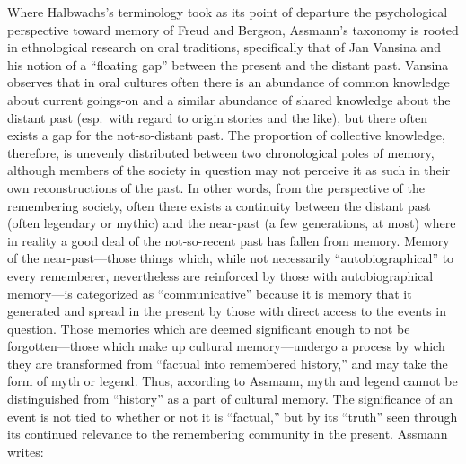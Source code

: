 Where Halbwachs's terminology took as its point of departure the
psychological perspective toward memory of
Freud\autocite{terdiman_radstone-schwarz2011} and
Bergson\autocite{ansellpearson_radstone-schwarz2011}, Assmann's taxonomy
is rooted in ethnological research on oral traditions, specifically that
of Jan Vansina and his notion of a ``floating gap'' between the present
and the distant past.\autocite{vansina1985} Vansina observes that in
oral cultures often there is an abundance of common knowledge about
current goings-on and a similar abundance of shared knowledge about the
distant past (esp.~with regard to origin stories and the like), but
there often exists a gap for the not-so-distant past. The proportion of
collective knowledge, therefore, is unevenly distributed between two
chronological poles of memory, although members of the society in
question may not perceive it as such in their own reconstructions of the
past.\autocites[23--24]{vansina1985}[As Assmann, observes, ``In the
cultural memory of a group, both levels of the past merge seamlessly
into one another.''][35]{assmann2011} In other words, from the
perspective of the remembering society, often there exists a continuity
between the distant past (often legendary or mythic) and the near-past
(a few generations, at most) where in reality a good deal of the
not-so-recent past has fallen from memory. Memory of the
near-past---those things which, while not necessarily
``autobiographical'' to every rememberer, nevertheless are reinforced by
those with autobiographical memory---is categorized as ``communicative''
because it is memory that it generated and spread in the present by
those with direct access to the events in question. Those memories which
are deemed significant enough to not be forgotten---those which make up
cultural memory---undergo a process by which they are transformed from
``factual into remembered history,'' and may take the form of myth or
legend.\autocite[37--38]{assmann2011} Thus, according to Assmann, myth
and legend cannot be distinguished from ``history'' as a part of
cultural memory. The significance of an event is not tied to whether or
not it is ``factual,'' but by its ``truth'' seen through its continued
relevance to the remembering community in the present.\autocite[Paul
Veyne offers a particularly stimulating discussion of the perception of
the past and its relationship to myth. He concludes his book with the
insightful quote, ``The theme of this book was very simple. Merely by
reading the title, anyone with the slightest historical background would
immediately have answered, `but of course they believed in their myths!'
We have simply wanted also to make clear that what is true of `them' is
also true of ourselves and to bring out the implications of this primary
truth.''][128--129]{veyne1988} Assmann writes:

